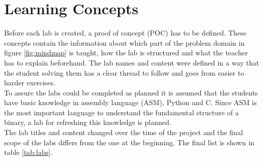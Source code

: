 \section{Learning Concepts}
Before each lab is created, a proof of concept (POC) has to be defined. These concepts contain the information about which part of the problem domain in figure \ref{fig:mindmap} is taught, how the lab is structured and what the teacher has to explain beforehand. The lab names and content were defined in a way that the student solving them has a clear thread to follow and goes from easier to harder exercises. \\
To assure the labs could be completed as planned it is assumed that the students have basic knowledge in assembly language (ASM), Python and C. Since ASM is the most important language to understand the fundamental structure of a binary, a lab for refreshing this knowledge is planned.\\
The lab titles and content changed over the time of the project and the final scope of the labs differs from the one at the beginning. The final list is shown in table \ref{tab:labs}. 

